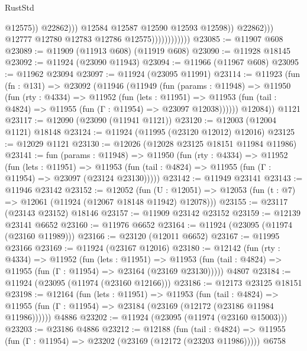 \begin{lexlean}{RustStd}
\begin{coremodule}
                                                @12575))
                                            @22862)))
                                      @12584
                                      @12587
                                      @12590
                                      @12593
                                      @12598))
                                  @22862)))
                            @12777
                            @12780
                            @12783
                            @12786
                            @12575))))))))))))
@23085 := @11907 @608
@23089 := @11909 (@11913 @608) (@11919 @608)
@23090 := @11928 @18145
@23092 := @11924 (@23090 @11943)
@23094 := @11966 (@11967 @608)
@23095 := @11962 @23094
@23097 := @11924 (@23095 @11991)
@23114 := @11923
    (fun (fn : @131) =>
    @23092
      (@11946
        (@11949
          (fun (params : @11948) =>
          @11950
            (fun (rty : @4334) =>
            @11952
              (fun (lets : @11951) =>
              @11953 (fun (tail : @4824) => @11955 (fun (Γ : @11954) => @23097 @12038))))))
        @12084))
    @1121
@23117 := @12090 (@23090 (@11941 @1121))
@23120 := @12003 (@12004 @1121) @18148
@23124 := @11924 (@11995 (@23120 @12012) @12016)
@23125 := @12029 @1121
@23130 := @12026 (@12028 @23125 @18151 @11984 @11986)
@23141 := fun (params : @11948) =>
  @11950
    (fun (rty : @4334) =>
    @11952
      (fun (lets : @11951) =>
      @11953 (fun (tail : @4824) => @11955 (fun (Γ : @11954) => @23097 (@23124 @23130)))))
@23142 := @11949 @23141
@23143 := @11946 @23142
@23152 := @12052
    (fun (U : @12051) => @12053 (fun (t : @7) => @12061 (@11924 (@12067 @18148 @11942) @12078)))
@23155 := @23117 (@23143 @23152) @18146
@23157 := @11909 @23142 @23152
@23159 := @12139 @23141 @6652
@23160 := @11976 @6652
@23164 := @11924 (@23095 (@11974 (@23160 @11989)))
@23166 := @23120 (@12011 @6652)
@23167 := @11995 @23166
@23169 := @11924 (@23167 @12016)
@23180 := @12142
    (fun (rty : @4334) =>
    @11952
      (fun (lets : @11951) =>
      @11953 (fun (tail : @4824) => @11955 (fun (Γ : @11954) => @23164 (@23169 @23130)))))
    @4807
@23184 := @11924 (@23095 (@11974 (@23160 @12166)))
@23186 := @12173 @23125 @18151
@23198 := @12164
    (fun (lets : @11951) =>
    @11953
      (fun (tail : @4824) =>
      @11955 (fun (Γ : @11954) => @23184 (@23169 (@12172 (@23186 @11984 @11986))))))
    @4886
@23202 := @11924 (@23095 (@11974 (@23160 @15003)))
@23203 := @23186 @4886
@23212 := @12188
    (fun (tail : @4824) => @11955 (fun (Γ : @11954) => @23202 (@23169 (@12172 (@23203 @11986)))))
    @6758

\end{coremodule}
\end{lexlean}
